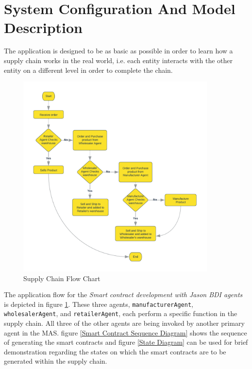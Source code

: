 \section{System Configuration And Model Description}

The application is designed to be as basic as possible in order to learn how a supply chain works in the real world, i.e. each entity interacts with the other entity on a different level in order to complete the chain.

    \begin{figure}[h]
    \centering
      \includegraphics[width=10cm]{includes/figures/Flow Chart.png}
      \caption{Supply Chain Flow Chart}
      \label{Flow chart}
    \end{figure}

\vspace{.5cm}

The application flow for the \textit{Smart contract development with Jason \ac{BDI} agents} is depicted in figure \ref{Flow chart}. These three agents, \texttt{manufacturerAgent}, \texttt{wholesalerAgent}, and \texttt{retailerAgent}, each perform a specific function in the supply chain. All three of the other agents are being invoked by another primary agent in the \ac{MAS}. figure 
 \ref{Smart Contract Sequence Diagram}  shows the sequence of generating the smart contracts and figure \ref{State Diagram} can be used for brief demonstration regarding the states on which the smart contracts are to be generated within the supply chain.

\vspace{.5cm}

